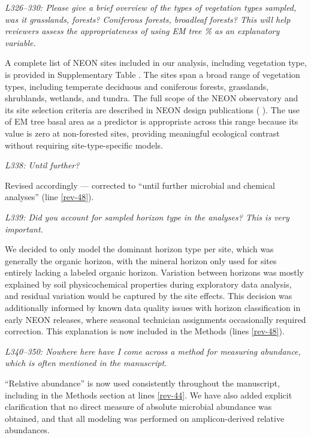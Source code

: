\documentclass[11pt]{article}
\begin{document}
\bigskip

\textit{L326--330: Please give a brief overview of the types of vegetation types sampled, was it grasslands, forests? Coniferous forests, broadleaf forests? This will help reviewers assess the appropriateness of using EM tree \% as an explanatory variable.}

A complete list of NEON sites included in our analysis, including vegetation type, is provided in Supplementary Table %
. The sites span a broad range of vegetation types, including temperate deciduous and coniferous forests, grasslands, shrublands, wetlands, and tundra. The full scope of the NEON observatory and its site selection criteria are described in NEON design publications (%
). The use of EM tree basal area as a predictor is appropriate across this range because its value is zero at non-forested sites, providing meaningful ecological contrast without requiring site-type-specific models.

\bigskip

\textit{L338: Until further?}

Revised accordingly --- corrected to ``until further microbial and chemical analyses'' (line \ref{rev-48}).

\bigskip

\textit{L339: Did you account for sampled horizon type in the analyses? This is very important.}

We decided to only model the dominant horizon type per site, which was generally the organic horizon, with the mineral horizon only used for sites entirely lacking a labeled organic horizon. Variation between horizons was mostly explained by soil physicochemical properties during exploratory data analysis, and residual variation would be captured by the site effects. This decision was additionally informed by known data quality issues with horizon classification in early NEON releases, where seasonal technician assignments occasionally required correction. This explanation is now included in the Methods (lines \ref{rev-48}).

\bigskip

\textit{L340--350: Nowhere here have I come across a method for measuring abundance, which is often mentioned in the manuscript.}

``Relative abundance'' is now used consistently throughout the manuscript, including in the Methods section at lines \ref{rev-44}. We have also added explicit clarification that no direct measure of absolute microbial abundance was obtained, and that all modeling was performed on amplicon-derived relative abundances.
\end{document}
